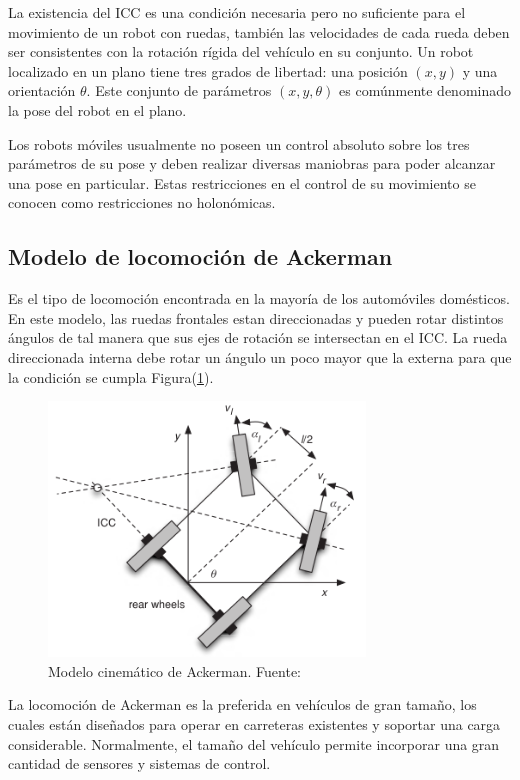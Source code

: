 La existencia del ICC es una condición necesaria pero no suficiente para el movimiento de un robot con ruedas, también las 
velocidades de cada rueda deben ser consistentes con la rotación rígida del vehículo en su conjunto. Un robot localizado en 
un plano tiene tres grados de libertad: una posición $(x,y)$ y una orientación $\theta$. Este conjunto de parámetros $(x,y,\theta)$ 
es comúnmente denominado la pose del robot en el plano.

Los robots móviles usualmente no poseen un control absoluto sobre los tres parámetros de su pose y deben realizar diversas 
maniobras para poder alcanzar una pose en particular. Estas restricciones en el control de su movimiento se conocen como 
restricciones no holonómicas. 

    \subsection{Modelo de locomoción de Ackerman}
    Es el tipo de locomoción encontrada en la mayoría de los automóviles domésticos. En este modelo, las ruedas frontales estan 
    direccionadas y pueden rotar distintos ángulos de tal manera que sus ejes de rotación se intersectan en el ICC. La rueda 
    direccionada interna debe rotar un ángulo un poco mayor que la externa para que la condición se cumpla Figura(\ref{fig:ackerman}).


    \begin{figure}[!h] 
        \centering
        \includegraphics[width=0.75\textwidth]{img/ackerman}
        \caption{Modelo cinemático de Ackerman. Fuente: \cite{GregoryMcGillUniversity2010} }
        \label{fig:ackerman}
    \end{figure}

    La locomoción de Ackerman es la preferida en vehículos de gran tamaño, los cuales están diseñados para operar en carreteras
    existentes y soportar una carga considerable. Normalmente, el tamaño del vehículo permite incorporar una gran cantidad 
    de sensores y sistemas de control. 
